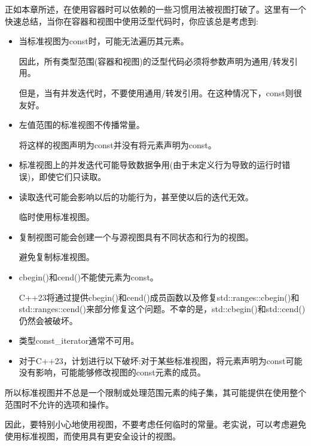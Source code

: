 正如本章所述，在使用容器时可以依赖的一些习惯用法被视图打破了。这里有一个快速总结，当你在容器和视图中使用泛型代码时，你应该总是考虑到:

\begin{itemize}
\item
当标准视图为const时，可能无法遍历其元素。

因此，所有类型范围(容器和视图)的泛型代码必须将参数声明为通用/转发引用。

但是，当有并发迭代时，不要使用通用/转发引用。在这种情况下，const则很友好。

\item
左值范围的标准视图不传播常量。

将这样的视图声明为const并没有将元素声明为const。

\item
标准视图上的并发迭代可能导致数据争用(由于未定义行为导致的运行时错误)，即使它们只读取。

\item
读取迭代可能会影响以后的功能行为，甚至使以后的迭代无效。

临时使用标准视图。

\item
复制视图可能会创建一个与源视图具有不同状态和行为的视图。

避免复制标准视图。

\item
cbegin()和cend()不能使元素为const。

C++23将通过提供cbegin()和cend()成员函数以及修复std::ranges::cbegin()和std::ranges::cend()来部分修复这个问题。不幸的是，std::cbegin()和std::cend()仍然会被破坏。

\item
类型const\_iterator通常不可用。

\item
对于C++23，计划进行以下破坏:对于某些标准视图，将元素声明为const可能没有影响，可能能够修改视图的const元素的成员。
\end{itemize}

所以标准视图并不总是一个限制或处理范围元素的纯子集，其可能提供在使用整个范围时不允许的选项和操作。

因此，要特别小心地使用视图，不要考虑任何临时的常量。老实说，可以考虑避免使用标准视图，而使用具有更安全设计的视图。